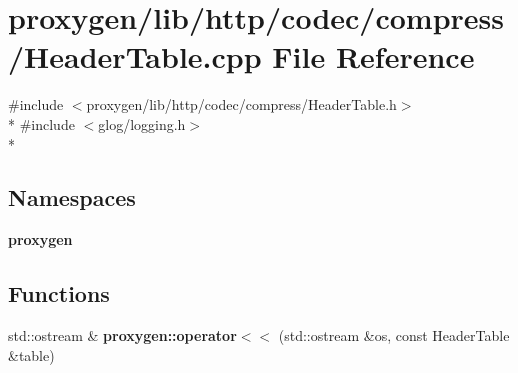 \section{proxygen/lib/http/codec/compress/\+Header\+Table.cpp File Reference}
\label{HeaderTable_8cpp}
{\ttfamily \#include $<$proxygen/lib/http/codec/compress/\+Header\+Table.\+h$>$}\\*
{\ttfamily \#include $<$glog/logging.\+h$>$}\\*
\subsection*{Namespaces}
\begin{DoxyCompactItemize}
\item 
 {\bf proxygen}
\end{DoxyCompactItemize}
\subsection*{Functions}
\begin{DoxyCompactItemize}
\item 
std\+::ostream \& {\bf proxygen\+::operator$<$$<$} (std\+::ostream \&os, const Header\+Table \&table)
\end{DoxyCompactItemize}
